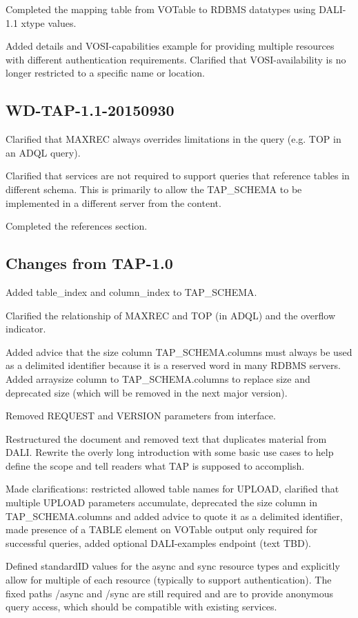 \documentclass[11pt,letter]{ivoa}
\newcommand{\tapschema}{TAP\_SCHE\-MA}
\newcommand{\tapschema}{\mbox{%
  \relsize{-0.5}TAP\discretionary{-}{}{\kern-2pt\_}SCHEMA}}
\begin{document}
Completed the mapping table from VOTable to RDBMS datatypes using DALI-1.1 xtype values.

Added details and VOSI-capabilities example for providing multiple resources with different 
authentication requirements. Clarified that VOSI-availability is no longer restricted to a
specific name or location.

\subsection{WD-TAP-1.1-20150930}

Clarified that MAXREC always overrides limitations in the query (e.g. 
TOP in an ADQL query).

Clarified that services are not required to support queries that reference tables 
in different schema. This is primarily to allow the \tapschema{} to be implemented 
in a different server from the content.

Completed the references section.

\subsection{Changes from TAP-1.0}

Added table\_index and column\_index to \tapschema.

Clarified the relationship of MAXREC and TOP (in ADQL) and the overflow 
indicator.

Added advice that the size column \tapschema.columns must always be used 
as a delimited identifier because it is a reserved word in many RDBMS 
servers. Added arraysize column to \tapschema.columns to replace size and 
deprecated size (which will be removed in the next major version).
 
Removed REQUEST and VERSION parameters from interface.

Restructured the document and removed text that duplicates material from DALI. 
Rewrite the overly long introduction with some basic use cases to help define 
the scope and tell readers what TAP is supposed to accomplish.

Made clarifications: restricted allowed table names for UPLOAD, clarified that 
multiple UPLOAD parameters accumulate, deprecated the size column in 
\tapschema.columns and added advice to quote it as a delimited 
identifier, made presence of a TABLE element on VOTable output only required for 
successful queries, added optional DALI-examples endpoint (text TBD).

Defined standardID values for the async and sync resource types and explicitly 
allow for multiple of each resource (typically to support authentication). The 
fixed paths /async and /sync are still required and are to provide anonymous 
query access, which should be compatible with existing services.



\end{document}
